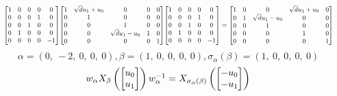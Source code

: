 \documentclass[11pt]{article}
\theoremstyle{definition}
\begin{document}
\[
\scaletoalign{\textwidth}{{\left[\begin{matrix}1 & 0 & 0 & 0 & 0\\0 & 0 & 0 & 1 & 0\\0 & 0 & 1 & 0 & 0\\0 & 1 & 0 & 0 & 0\\0 & 0 & 0 & 0 & -1\end{matrix}\right]} {\left[\begin{matrix}1 & \sqrt{d} u_{1} + u_{0} & 0 & 0 & 0\\0 & 1 & 0 & 0 & 0\\0 & 0 & 1 & 0 & 0\\0 & 0 & \sqrt{d} u_{1} - u_{0} & 1 & 0\\0 & 0 & 0 & 0 & 1\end{matrix}\right]} {\left[\begin{matrix}1 & 0 & 0 & 0 & 0\\0 & 0 & 0 & 1 & 0\\0 & 0 & 1 & 0 & 0\\0 & 1 & 0 & 0 & 0\\0 & 0 & 0 & 0 & -1\end{matrix}\right]} = {\left[\begin{matrix}1 & 0 & 0 & \sqrt{d} u_{1} + u_{0} & 0\\0 & 1 & \sqrt{d} u_{1} - u_{0} & 0 & 0\\0 & 0 & 1 & 0 & 0\\0 & 0 & 0 & 1 & 0\\0 & 0 & 0 & 0 & 1\end{matrix}\right]}}
\]
\[
\alpha = \left( 0, \  -2, \  0, \  0, \  0\right), \beta = \left( 1, \  0, \  0, \  0, \  0\right), \sigma_{\alpha}(\beta) = \left( 1, \  0, \  0, \  0, \  0\right)
\]
\[
\scaletoalign{\textwidth}{w_{\alpha} X_{\beta}\left(\left[\begin{matrix}u_{0}\\u_{1}\end{matrix}\right]\right) w_{\alpha}^{-1} = X_{\sigma_{\alpha}\left(\beta\right)}\left(\left[\begin{matrix}- u_{0}\\- u_{1}\end{matrix}\right]\right)}
\]
\end{document}
